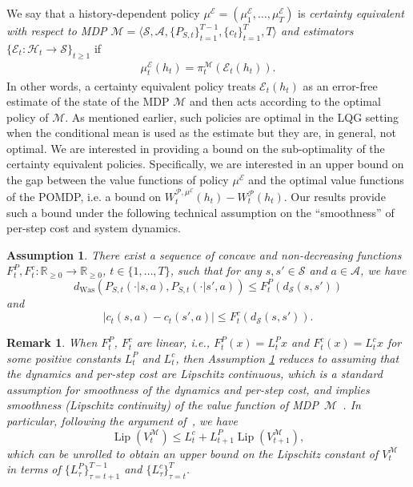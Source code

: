 \documentclass[letterpaper, 10pt]{IEEEtran}
\theoremstyle{plain}
\newtheorem{remark}{Remark}
\theoremstyle{nonumberplain}
\theoremstyle{plain}
\newtheorem{assumption}{Assumption}
\newcommand*\ALPHABET{\mathcal}
\newcommand*\reals{\mathds{R}}
\newcommand\dWas{d_{\mathrm{Was}}}
\newcommand\EST{\mathcal{E}}
\DeclareMathOperator{\Lip}{Lip}
\begin{document}
We say that a history-dependent policy $\mu^\EST = (\mu^\EST_1, \dots, \mu^\EST_T)$ is \emph{certainty equivalent with respect to MDP $ {\ALPHABET M} = \langle \ALPHABET S, \ALPHABET A, \{P_{S,t}\}_{t=1}^{T-1}, \{c_t\}_{t=1}^T,T\rangle$ and estimators  $\{\EST_t\colon \ALPHABET H_t \to  {\ALPHABET S}\}_{t \ge 1}$} if 
\begin{align}\label{eq:cert_equiv}
    \mu^\EST_t(h_t) = \pi^{ {\ALPHABET M}}_t(\EST_t(h_t)).
\end{align}
In other words, a certainty equivalent policy treats   $\EST_t(h_t)$ as an error-free estimate of the  state of the  MDP $ {\ALPHABET M}$ and then acts according to the optimal policy of $ {\ALPHABET M}$.
As mentioned earlier, such policies are optimal in the LQG setting when the conditional mean is used as the estimate but they are, in general, not optimal. We are interested in providing a bound on the sub-optimality of the certainty equivalent policies. Specifically, we are interested in an upper bound on the gap between the value functions of policy $\mu^\EST$ and the optimal value functions of the POMDP, i.e. a bound on $W^{{\ALPHABET{P}},\mu^\EST}_t(h_t) - W^{\ALPHABET{P}}_t(h_t)$. Our results provide such a bound under the following technical assumption on the ``smoothness'' of per-step cost and system dynamics. 

 \begin{assumption}\label{ass:lipschitz} 
    There exist a sequence of concave and non-decreasing functions $F^P_t, F^c_t \colon \reals_{\ge 0} \to \reals_{\ge 0}$, $t \in \{1, \dots, T\}$, such that for any $s, s' \in \ALPHABET S$ and $a \in \ALPHABET A$, we have
    \begin{equation}\label{eq:Lip-P-1}
        \dWas(P_{S,t}(\cdot | s, a), P_{S,t}(\cdot | s', a)) \le F^P_t(d_{\ALPHABET S}(s, s'))
    \end{equation}
    and
    \begin{equation}\label{eq:Lip-c-1}
        \bigl| c_t(s,a) - c_t(s',a) \bigr| \le F^c_t(d_{\ALPHABET S}(s, s')).
    \end{equation}
\end{assumption}
\begin{remark}\label{rem:lip_linear}
When $F^P_t$, $F^c_t$ are linear, i.e., $F^P_t(x) = L_t^{P}x$ and $F^c_t(x) = L_t^{c}x$ for some positive constants $L^P_t$ and $L^c_t$, then 
Assumption \ref{ass:lipschitz} reduces to assuming that the dynamics and per-step cost are Lipschitz continuous, which  is a  standard assumption for smoothness of the dynamics and per-step cost, and implies smoothness (Lipschitz continuity) of the value function of MDP~$ {\ALPHABET M}$~\cite{Hinderer2005}. In particular, following the argument of~\cite{Hinderer2005}, we have
    \[
        \Lip(V^{{\ALPHABET M}}_t) \le L^c_t + L^P_{t+1} \Lip(V^{{\ALPHABET M}}_{t+1}),
    \]
    which can be unrolled to obtain an upper bound on the Lipschitz constant of $V^{\ALPHABET M}_t$ in terms of $\{L^P_{\tau}\}_{\tau=t+1}^{T-1}$ and $\{L^c_{\tau}\}_{\tau=t}^{T}$.
\end{remark}
\end{document}
